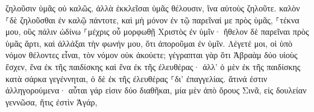 \documentclass{openreader}
\begin{document}
ζηλοῦσιν ὑμᾶς οὐ καλῶς, ἀλλὰ ἐκκλεῖσαι ὑμᾶς θέλουσιν, ἵνα αὐτοὺς ζηλοῦτε. 
καλὸν ⸀δὲ ζηλοῦσθαι ἐν καλῷ πάντοτε, καὶ μὴ μόνον ἐν τῷ παρεῖναί με πρὸς ὑμᾶς, 
⸀τέκνα μου, οὓς πάλιν ὠδίνω ⸀μέχρις οὗ μορφωθῇ Χριστὸς ἐν ὑμῖν· 
ἤθελον δὲ παρεῖναι πρὸς ὑμᾶς ἄρτι, καὶ ἀλλάξαι τὴν φωνήν μου, ὅτι ἀποροῦμαι ἐν ὑμῖν. 
Λέγετέ μοι, οἱ ὑπὸ νόμον θέλοντες εἶναι, τὸν νόμον οὐκ ἀκούετε; 
γέγραπται γὰρ ὅτι Ἀβραὰμ δύο υἱοὺς ἔσχεν, ἕνα ἐκ τῆς παιδίσκης καὶ ἕνα ἐκ τῆς ἐλευθέρας· 
ἀλλ’ ὁ μὲν ἐκ τῆς παιδίσκης κατὰ σάρκα γεγέννηται, ὁ δὲ ἐκ τῆς ἐλευθέρας ⸀δι’ ἐπαγγελίας. 
ἅτινά ἐστιν ἀλληγορούμενα· αὗται γάρ εἰσιν δύο διαθῆκαι, μία μὲν ἀπὸ ὄρους Σινᾶ, εἰς δουλείαν γεννῶσα, ἥτις ἐστὶν Ἁγάρ, 
\end{document}
